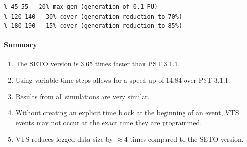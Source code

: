 \documentclass[12pt]{article}
\begin{document}
\begin{center}
\begin{minipage}{.47\linewidth}
\begin{itemize}
\begin{Verbatim}[fontsize=\scriptsize]
% cloud cover events
% 45-55 - 20% max gen (generation of 0.1 PU)
% 120-140 - 30% cover (generation reduction to 70%)
% 180-190 - 15% cover (generation reduction to 85%)
\end{Verbatim}
\end{itemize}
\end{minipage}

\end{center}

\paragraph{Summary} 
\begin{enumerate}
\item The SETO version is 3.65 times faster than PST 3.1.1.
\item Using variable time steps allows for a speed up of 14.84 over PST 3.1.1.
\item Results from all simulations are very similar.
\item Without creating an explicit time block at the beginning of an event, VTS events may not occur at the exact time they are programmed.
\item VTS reduces logged data size by $\approx$4 times compared to the SETO version.
\end{enumerate}
\end{document}
